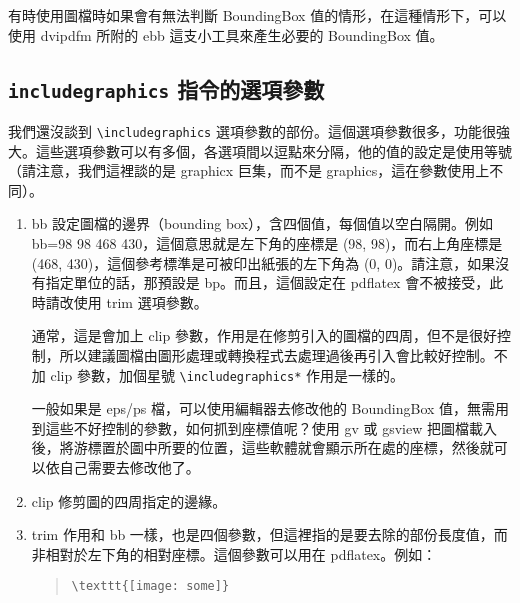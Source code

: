有時使用圖檔時如果會有無法判斷 BoundingBox 值的情形，在這種情形下，可以使用 {\sffamily dvipdfm} 所附的 {\ttfamily ebb} 這支小工具來產生必要的 BoundingBox 值。

\subsection{\texttt{includegraphics} 指令的選項參數}

我們還沒談到 \verb|\includegraphics| 選項參數的部份。這個選項參數很多，功能很強大。這些選項參數可以有多個，各選項間以逗點來分隔，他的值的設定是使用等號（請注意，我們這裡談的是 {\sffamily graphicx} 巨集，而不是 {\sffamily graphics}，這在參數使用上不同）。

\begin{enumerate}

  \item {\ttfamily bb} \newline
        設定圖檔的邊界（bounding box），含四個值，每個值以空白隔開。例如 {\ttfamily bb=98 98 468 430}，這個意思就是左下角的座標是 (98, 98)，而右上角座標是 (468, 430)，這個參考標準是可被印出紙張的左下角為 (0, 0)。請注意，如果沒有指定單位的話，那預設是 bp。而且，這個設定在 {\ttfamily pdflatex} 會不被接受，此時請改使用 {\ttfamily trim} 選項參數。

        通常，這是會加上 {\ttfamily clip} 參數，作用是在修剪引入的圖檔的四周，但不是很好控制，所以建議圖檔由圖形處理或轉換程式去處理過後再引入會比較好控制。不加 {\ttfamily clip} 參數，加個星號 \verb|\includegraphics*| 作用是一樣的。

        一般如果是 eps/ps 檔，可以使用編輯器去修改他的 BoundingBox 值，無需用到這些不好控制的參數，如何抓到座標值呢？使用 {\ttfamily gv} 或 {\ttfamily gsview} 把圖檔載入後，將游標置於圖中所要的位置，這些軟體就會顯示所在處的座標，然後就可以依自己需要去修改他了。

  \item {\ttfamily clip} \newline
        修剪圖的四周指定的邊緣。

  \item {\ttfamily trim} \newline
        作用和 {\ttfamily bb} 一樣，也是四個參數，但這裡指的是要去除的部份長度值，而非相對於左下角的相對座標。這個參數可以用在 {\ttfamily pdflatex}。例如：

        \begin{quote}
          \begin{verbatim}
\texttt{[image: some]}
\end{verbatim}
        \end{quote}


\end{enumerate}
